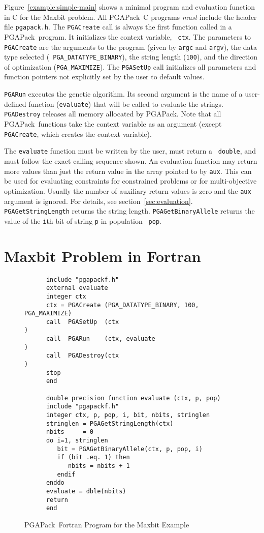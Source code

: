 \documentclass{report}
\newcommand{\pga}{PGAPack}
\begin{document}
Figure~\ref{example:simple-main} shows a minimal program and evaluation
function in C for the Maxbit problem.  All \pga\ C programs {\em must} include
the header file {\tt pgapack.h}. The {\tt PGACreate} call is always the first
function called in a \pga\ program.  It initializes the context variable, {\tt
ctx}.  The parameters to {\tt PGACreate} are the arguments to the program
(given by {\tt argc} and {\tt argv}), the data type selected ({\tt
PGA\_DATATYPE\_BINARY}), the string length ({\tt 100}), and the direction of
optimization ({\tt PGA\_MAXIMIZE}).  The {\tt PGASetUp} call initializes all
parameters and function pointers not explicitly set by the user to default
values.

{\tt PGARun} executes the genetic algorithm.  Its second argument is the name
of a user-defined function ({\tt evaluate}) that will be called to evaluate
the strings.  {\tt PGADestroy} releases all memory allocated by \pga.  Note
that all \pga\ functions take the context variable as an argument (except {\tt
PGACreate}, which creates the context variable).

The {\tt evaluate} function must be written by the user, must return a {\tt
double}, and must follow the exact calling sequence shown. An evaluation
function may return more values than just the return value in the array
pointed to by \verb+aux+. This can be used for evaluating constraints for
constrained problems or for multi-objective optimization. Usually the
number of auxiliary return values is zero and the \verb+aux+ argument is
ignored. For details, see section~\ref{sec:evaluation}.
{\tt PGAGetStringLength} returns the string length.  {\tt PGAGetBinaryAllele}
returns the value of the {\tt i}th bit of string {\tt p} in population {\tt
pop}.

\section{Maxbit Problem in Fortran}
\label{sec:simple-example-fortran} 

\begin{figure}
\begin{verbatim}
      include "pgapackf.h"
      external evaluate
      integer ctx
      ctx = PGACreate (PGA_DATATYPE_BINARY, 100, PGA_MAXIMIZE)
      call  PGASetUp  (ctx                                   )
      call  PGARun    (ctx, evaluate                         )
      call  PGADestroy(ctx                                   )
      stop
      end

      double precision function evaluate (ctx, p, pop)
      include "pgapackf.h"
      integer ctx, p, pop, i, bit, nbits, stringlen
      stringlen = PGAGetStringLength(ctx)
      nbits     = 0
      do i=1, stringlen
         bit = PGAGetBinaryAllele(ctx, p, pop, i)
         if (bit .eq. 1) then 
            nbits = nbits + 1
         endif
      enddo
      evaluate = dble(nbits)
      return
      end
\end{verbatim}
\caption{\pga\ Fortran Program for the Maxbit Example}
\label{example:maxbit-fortran}
\end{figure}
\end{document}
